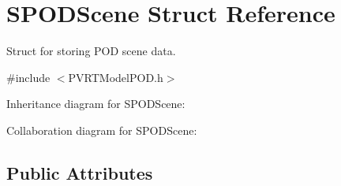 \hypertarget{struct_s_p_o_d_scene}{\section{S\+P\+O\+D\+Scene Struct Reference}
\label{struct_s_p_o_d_scene}
}


Struct for storing P\+O\+D scene data.  




{\ttfamily \#include $<$P\+V\+R\+T\+Model\+P\+O\+D.\+h$>$}



Inheritance diagram for S\+P\+O\+D\+Scene\+:


Collaboration diagram for S\+P\+O\+D\+Scene\+:
\subsection*{Public Attributes}
